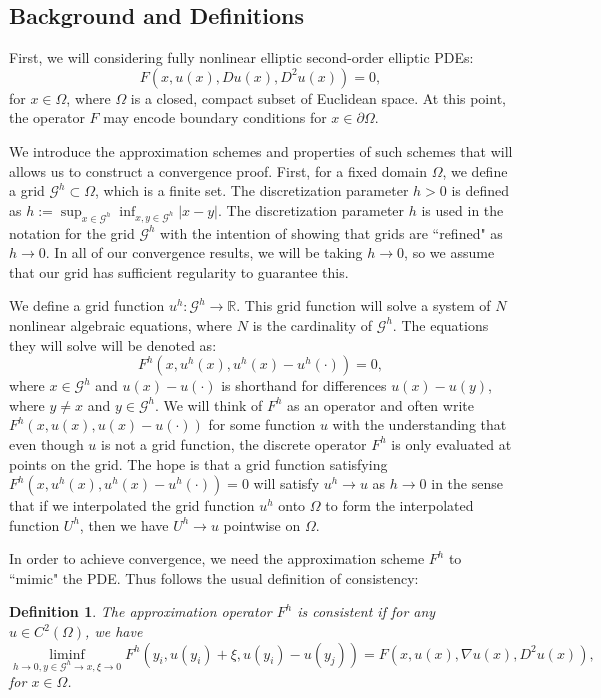\documentclass{amsart}
\theoremstyle{lemma}
\newtheorem{definition}[theorem]{Definition}
\theoremstyle{remark}
\begin{document}
\subsection{Background and Definitions}

First, we will considering fully nonlinear elliptic second-order elliptic PDEs:
\begin{equation}\label{eq:elliptic}
F(x, u(x), Du(x), D^2 u(x)) = 0,
\end{equation}
for $x \in \Omega$, where $\Omega$ is a closed, compact subset of Euclidean space. At this point, the operator $F$ may encode boundary conditions for $x \in \partial \Omega$.


We introduce the approximation schemes and properties of such schemes that will allows us to construct a convergence proof. First, for a fixed domain $\Omega$, we define a grid $\mathcal{G}^h \subset \Omega$, which is a finite set. The discretization parameter $h>0$ is defined as $h:= \sup_{x \in \mathcal{G}^h} \inf_{x, y \in \mathcal{G}^h} \vert x - y \vert$. The discretization parameter $h$ is used in the notation for the grid $\mathcal{G}^h$ with the intention of showing that grids are ``refined" as $h \rightarrow 0$. In all of our convergence results, we will be taking $h \rightarrow 0$, so we assume that our grid has sufficient regularity to guarantee this.

We define a grid function $u^h:\mathcal{G}^h \rightarrow \mathbb{R}$. This grid function will solve a system of $N$ nonlinear algebraic equations, where $N$ is the cardinality of $\mathcal{G}^h$. The equations they will solve will be denoted as:
\begin{equation}
F^h(x, u^h(x), u^h(x) - u^h(\cdot)) =0,
\end{equation}
where $x \in \mathcal{G}^h$ and $u(x) - u(\cdot)$ is shorthand for differences $u(x) - u(y)$, where $y \neq x$ and $y \in \mathcal{G}^h$. We will think of $F^h$ as an operator and often write $F^h(x, u(x), u(x) - u(\cdot))$ for some function $u$ with the understanding that even though $u$ is not a grid function, the discrete operator $F^h$ is only evaluated at points on the grid. The hope is that a grid function satisfying $F^h(x, u^h(x), u^h(x) - u^h(\cdot)) =0$ will satisfy $u^h \rightarrow u$ as $h \rightarrow 0$ in the sense that if we interpolated the grid function $u^h$ onto $\Omega$ to form the interpolated function $U^h$, then we have $U^h \rightarrow u$ pointwise on $\Omega$.

In order to achieve convergence, we need the approximation scheme $F^h$ to ``mimic" the PDE. Thus follows the usual definition of consistency:
\begin{definition}
The approximation operator $F^h$ is consistent if for any $u \in C^2(\Omega)$, we have
\begin{equation}
\liminf_{h \rightarrow 0, y \in \mathcal{G}^h \rightarrow x, \xi \rightarrow 0} F^h(y_i, u(y_i) + \xi, u(y_i) - u(y_j)) = F(x, u(x), \nabla u(x), D^2 u(x)),
\end{equation}
for $x \in \Omega$.
\end{definition}
\end{document}
